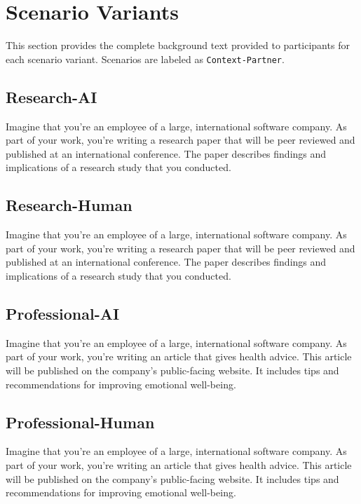 \section{Scenario Variants}
\label{appendix:scenarios}

This section provides the complete background text provided to participants for each scenario variant. Scenarios are labeled as \texttt{Context-Partner}.

\subsection{Research-AI}
Imagine that you’re an employee of a large, international software company. As part of your work, you're writing a research paper that will be peer reviewed and published at an international conference. The paper describes findings and implications of a research study that you conducted.

\subsection{Research-Human}
Imagine that you’re an employee of a large, international software company. As part of your work, you're writing a research paper that will be peer reviewed and published at an international conference. The paper describes findings and implications of a research study that you conducted.

\subsection{Professional-AI}
Imagine that you’re an employee of a large, international software company. As part of your work, you’re writing an article that gives health advice. This article will be published on the company's public-facing website. It includes tips and recommendations for improving emotional well-being.

\subsection{Professional-Human}
Imagine that you’re an employee of a large, international software company. As part of your work, you’re writing an article that gives health advice. This article will be published on the company's public-facing website. It includes tips and recommendations for improving emotional well-being.

